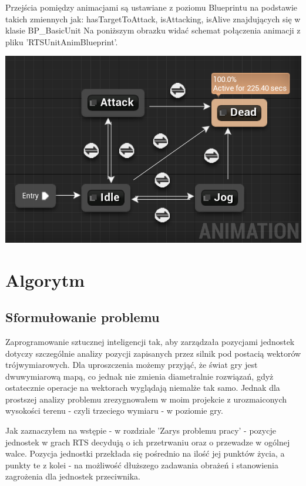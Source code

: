 \documentclass[12pt]{report}
\begin{document}
Przejścia pomiędzy animacjami są ustawiane z poziomu Blueprintu na podstawie takich zmiennych jak: hasTargetToAttack, isAttacking, isAlive znajdujących się w klasie BP\_BasicUnit
Na poniższym obrazku widać schemat połączenia animacji z pliku 'RTSUnitAnimBlueprint'.

\includegraphics[scale=0.6]{animGraph.png}


\chapter{Algorytm}
\section{Sformułowanie problemu}
Zaprogramowanie sztucznej inteligencji tak, aby zarządzała pozycjami jednostek dotyczy szczególnie analizy pozycji zapisanych przez silnik pod postacią wektorów trójwymiarowych. Dla uproszczenia możemy przyjąć, że świat gry jest dwuwymiarową mapą, co jednak nie zmienia diametralnie rozwiązań, gdyż ostatecznie operacje na wektorach wyglądają niemalże tak samo. Jednak dla prostszej analizy problemu zrezygnowałem w moim projekcie z urozmaiconych wysokości terenu - czyli trzeciego wymiaru - w poziomie gry.

Jak zaznaczyłem na wstępie - w rozdziale 'Zarys problemu pracy' - pozycje jednostek w grach RTS decydują o ich przetrwaniu oraz o przewadze w ogólnej walce. Pozycja jednostki przekłada się pośrednio na ilość jej punktów życia, a punkty te z kolei - na możliwość dłuższego zadawania obrażeń i stanowienia zagrożenia dla jednostek przeciwnika.
\end{document}
